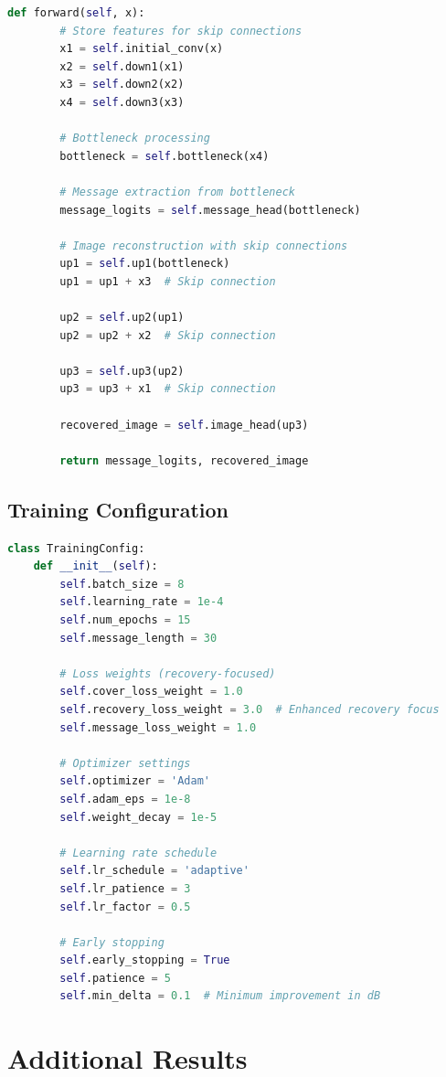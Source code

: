 \documentclass[12pt,a4paper]{report}
\begin{document}
\begin{lstlisting}[language=Python, caption=Advanced Recovery Decoder Implementation]
    def forward(self, x):
        # Store features for skip connections
        x1 = self.initial_conv(x)
        x2 = self.down1(x1)
        x3 = self.down2(x2)
        x4 = self.down3(x3)
        
        # Bottleneck processing
        bottleneck = self.bottleneck(x4)
        
        # Message extraction from bottleneck
        message_logits = self.message_head(bottleneck)
        
        # Image reconstruction with skip connections
        up1 = self.up1(bottleneck)
        up1 = up1 + x3  # Skip connection
        
        up2 = self.up2(up1)
        up2 = up2 + x2  # Skip connection
        
        up3 = self.up3(up2)
        up3 = up3 + x1  # Skip connection
        
        recovered_image = self.image_head(up3)
        
        return message_logits, recovered_image
\end{lstlisting}

\section{Training Configuration}

\begin{lstlisting}[language=Python, caption=Training Configuration]
class TrainingConfig:
    def __init__(self):
        self.batch_size = 8
        self.learning_rate = 1e-4
        self.num_epochs = 15
        self.message_length = 30
        
        # Loss weights (recovery-focused)
        self.cover_loss_weight = 1.0
        self.recovery_loss_weight = 3.0  # Enhanced recovery focus
        self.message_loss_weight = 1.0
        
        # Optimizer settings
        self.optimizer = 'Adam'
        self.adam_eps = 1e-8
        self.weight_decay = 1e-5
        
        # Learning rate schedule
        self.lr_schedule = 'adaptive'
        self.lr_patience = 3
        self.lr_factor = 0.5
        
        # Early stopping
        self.early_stopping = True
        self.patience = 5
        self.min_delta = 0.1  # Minimum improvement in dB
\end{lstlisting}

\chapter{Additional Results}
\label{app:results}
\end{document}
